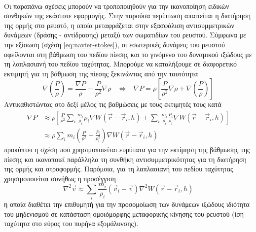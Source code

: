 \paragraph{} Οι παραπάνω σχέσεις μπορούν να τροποποιηθούν για την ικανοποίηση ειδικών
συνθηκών της εκάστοτε εφαρμογής. Στην παρούσα περίπτωση απαιτείται η διατήρηση της ορμής
στο ρευστό, η οποία μεταφράζεται στην εξασφάλιση αντισυμμετρικών δυνάμεων (δράσης -
αντίδρασης) μεταξύ των σωματιδίων του ρευστού. Σύμφωνα με την εξίσωση 
(σχέση \ref{eq:navier-stokes}), οι εσωτερικές δυνάμεις του ρευστού οφείλονται στη βάθμωση
του πεδίου πίεσης και το γινόμενο του δυναμικού ιξώδους με τη λαπλασιανή του πεδίου
ταχύτητας. Μπορούμε να καταλήξουμε σε διαφορετικό εκτιμητή για τη βάθμωση της πίεσης
ξεκινώντας από την ταυτότητα
\begin{equation*}
  \label{eq:grad-identity}
  \nabla \left( \frac{P}{\rho} \right) =
  \frac{\nabla P}{\rho}-
  \frac{P}{\rho^2} \nabla \rho
  \hspace{10pt} \Leftrightarrow \hspace{10pt}
  \nabla P = \rho \left[ \frac{P}{\rho^2} \nabla \rho + \nabla \left( \frac{P}{\rho}
    \right) \right]
\end{equation*}
Αντικαθιστώντας στο δεξί μέλος τις βαθμώσεις με τους εκτιμητές τους κατά 
\begin{align}
  \label{eq:grad-est}
  \nabla P &\approx \rho \left[ \frac{P}{\rho^2} \sum_i \frac{m_i}{\rho_i} \rho_i \nabla
             W(\vec{r}-\vec{r}_i, h)
             +
             \sum_i \frac{m_i}{\rho_i} \frac{P_i}{\rho_i} \nabla W(\vec{r}-\vec{r}_i, h)
             \right] \nonumber \\
           &\approx\rho \sum_i m_i \left(\frac{P}{\rho^2} + \frac{P_i}{\rho_i^2} \right)
             \nabla W(\vec{r}-\vec{r}_i, h)
\end{align}
προκύπτει η σχέση που χρησιμοποιείται ευρύτατα για την εκτίμηση της βάθμωσης της πίεσης
και ικανοποιεί παράλληλα τη συνθήκη αντισυμμετρικότητας για τη διατήρηση της ορμής και
στροφορμής. Παρόμοια, για τη λαπλασιανή του πεδίου ταχύτητας χρησιμοποιείται συνήθως η
προσέγγιση
\begin{equation}
  \label{eq:lapl-est}
  \nabla^2\vec{v} \approx \sum_i \frac{m_i}{\rho_i} (\vec{v}_i - \vec{v}) \nabla^2
  W(\vec{r}-\vec{r}_i, h)
\end{equation}
η οποία διαθέτει την επιθυμητή για την προσομοίωση των δυνάμεων ιξώδους ιδιότητα του
μηδενισμού σε κατάσταση ομοιόμορφης μεταφορικής κίνησης του ρευστού (ίση ταχύτητα στο
εύρος του πυρήνα εξομάλυνσης).

